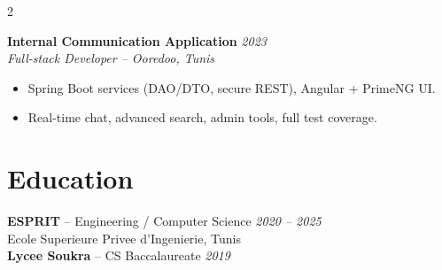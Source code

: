 \documentclass[10pt,a4paper]{article}
\begin{document}
\begin{paracol}{2}
\begin{rightcolumn}
\begin{minipage}{0.9\linewidth}
\vspace{4pt}
\textbf{Internal Communication Application} \hfill \textit{2023}\\
\textit{Full-stack Developer -- Ooredoo, Tunis}
\begin{itemize}[leftmargin=12pt,itemsep=1pt,topsep=2pt,parsep=0pt]
  \item Spring Boot services (DAO/DTO, secure REST), Angular + PrimeNG UI.
  \item Real-time chat, advanced search, admin tools, full test coverage.
\end{itemize}

\section*{Education}
\small
\textbf{ESPRIT} -- Engineering / Computer Science \hfill \textit{2020 -- 2025}\\
Ecole Superieure Privee d'Ingenierie, Tunis\\[3pt]
\textbf{Lycee Soukra} -- CS Baccalaureate \hfill \textit{2019}

\end{minipage}
\end{rightcolumn}

\end{paracol}
\end{document}
